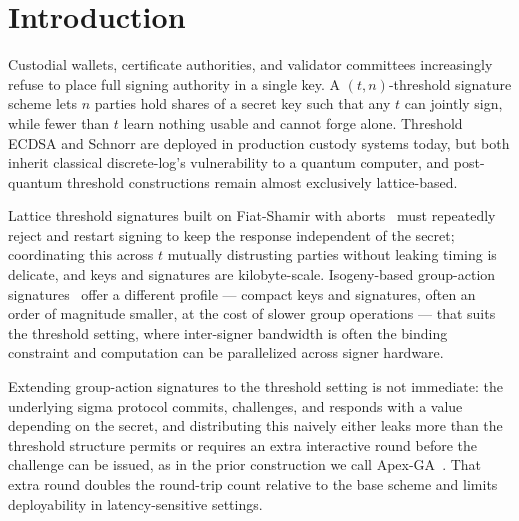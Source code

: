 \section{Introduction}
\label{sec:intro}

Custodial wallets, certificate authorities, and validator committees increasingly refuse to place full signing authority in a single key. A $(t,n)$-threshold signature scheme lets $n$ parties hold shares of a secret key such that any $t$ can jointly sign, while fewer than $t$ learn nothing usable and cannot forge alone. Threshold ECDSA and Schnorr are deployed in production custody systems today, but both inherit classical discrete-log's vulnerability to a quantum computer, and post-quantum threshold constructions remain almost exclusively lattice-based.

Lattice threshold signatures built on Fiat-Shamir with aborts~\cite{nimbus2021lattice} must repeatedly reject and restart signing to keep the response independent of the secret; coordinating this across $t$ mutually distrusting parties without leaking timing is delicate, and keys and signatures are kilobyte-scale. Isogeny-based group-action signatures~\cite{sterling2019hhs,beullens2020csifish} offer a different profile --- compact keys and signatures, often an order of magnitude smaller, at the cost of slower group operations --- that suits the threshold setting, where inter-signer bandwidth is often the binding constraint and computation can be parallelized across signer hardware.

Extending group-action signatures to the threshold setting is not immediate: the underlying sigma protocol commits, challenges, and responds with a value depending on the secret, and distributing this naively either leaks more than the threshold structure permits or requires an extra interactive round before the challenge can be issued, as in the prior construction we call Apex-GA~\cite{voss2023apexga}. That extra round doubles the round-trip count relative to the base scheme and limits deployability in latency-sensitive settings.

